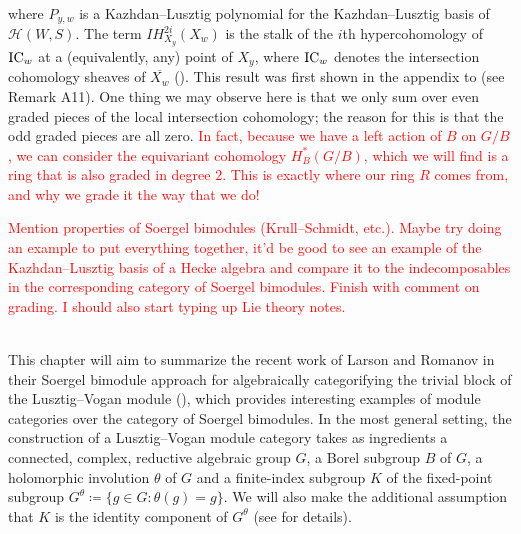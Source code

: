 \begin{remark}
\begin{align*}
\begin{split}
\end{split}
\end{align*}
\noindent where $P_{y,w}$ is a Kazhdan--Lusztig polynomial for the Kazhdan--Lusztig basis of $\mathscr{H}(W, S)$. The term $IH^{2i}_{X_y}(X_w)$ is the stalk of the $i$th hypercohomology of $\textnormal{IC}_w$ at a (equivalently, any) point of $X_y$, where $\textnormal{IC}_w$ denotes the intersection cohomology sheaves of $\overline{X_w}$ (\cite[13.13]{EMTW20}). This result was first shown in the appendix to \cite{KL79} (see Remark A11). One thing we may observe here is that we only sum over even graded pieces of the local intersection cohomology; the reason for this is that the odd graded pieces are all zero. \textcolor{red}{In fact, because we have a left action of $B$ on $G/B$, we can consider the equivariant cohomology $H_B^*(G/B)$, which we will find is a ring that is also graded in degree $2$. This is exactly where our ring $R$ comes from, and why we grade it the way that we do!}\newpage
\end{remark}

\noindent\textcolor{red}{Mention properties of Soergel bimodules (Krull--Schmidt, etc.). Maybe try doing an example to put everything together, it'd be good to see an example of the Kazhdan--Lusztig basis of a Hecke algebra and compare it to the indecomposables in the corresponding category of Soergel bimodules. Finish with comment on grading. I should also start typing up Lie theory notes.}
\newpage

\noindent 

\newpage

\noindent\\ This chapter will aim to summarize the recent work of Larson and Romanov in their Soergel bimodule approach for algebraically categorifying the trivial block of the Lusztig--Vogan module (\cite{LR22}), which provides interesting examples of module categories over the category of Soergel bimodules. In the most general setting, the construction of a Lusztig--Vogan module category takes as ingredients a connected, complex, reductive algebraic group $G$, a Borel subgroup $B$ of $G$, a holomorphic involution $\theta$ of $G$ and a finite-index subgroup $K$ of the fixed-point subgroup $G^\theta \coloneqq \{g \in G : \theta(g) = g\}$. We will also make the additional assumption that $K$ is the identity component of $G^\theta$ (see \cite{LR22} for details).\\

